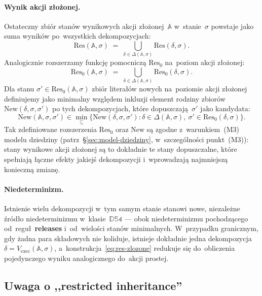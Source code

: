 \documentclass[11pt,a4paper]{article}
\newcommand{\releases}{\textbf{releases}}
\theoremstyle{definition}
\begin{document}
\paragraph{Wynik akcji złożonej.}
Ostateczny zbiór stanów wynikowych akcji złożonej~$\mathbb{A}$
w~stanie~$\sigma$ powstaje jako suma wyników po~wszystkich dekompozycjach:
\begin{equation}
  \label{eq:res-zlozone}
  \mathrm{Res}(\mathbb{A},\sigma)
  \;=\; \bigcup_{\delta \in \Delta(\mathbb{A},\sigma)}
        \mathrm{Res}(\delta,\sigma).
\end{equation}
Analogicznie rozszerzamy funkcję pomocniczą $\mathrm{Res}_0$ na~poziom
akcji złożonej:
\[
  \mathrm{Res}_0(\mathbb{A},\sigma)
    \;=\; \bigcup_{\delta \in \Delta(\mathbb{A},\sigma)}
          \mathrm{Res}_0(\delta,\sigma).
\]
Dla stanu $\sigma' \in \mathrm{Res}_0(\mathbb{A},\sigma)$ zbiór
literałów nowych na~poziomie akcji złożonej definiujemy jako
minimalny względem inkluzji element rodziny zbiorów
$\mathrm{New}(\delta,\sigma,\sigma')$ po tych dekompozycjach, które
dopuszczają~$\sigma'$ jako kandydata:
\[
  \mathrm{New}(\mathbb{A},\sigma,\sigma')
    \in \min_{\subseteq}
      \{\mathrm{New}(\delta,\sigma,\sigma') :
        \delta \in \Delta(\mathbb{A},\sigma),\
        \sigma' \in \mathrm{Res}_0(\delta,\sigma)\}.
\]
Tak zdefiniowane rozszerzenia $\mathrm{Res}_0$ oraz $\mathrm{New}$
są zgodne z~warunkiem~(M3) modelu dziedziny (patrz~\S\ref{sec:model-dziedziny},
w~szczególności punkt~(M3)): stany wynikowe akcji złożonej
są to dokładnie te stany dopuszczalne, które spełniają łączne efekty
jakiejś dekompozycji i~wprowadzają najmniejszą konieczną zmianę.

\paragraph{Niedeterminizm.}
Istnienie wielu dekompozycji w~tym samym stanie stanowi nowe, niezależne
źródło niedeterminizmu w~klasie~$\mathbb{DS4}$ --- obok niedeterminizmu
pochodzącego od~reguł~\releases{} i~od~wielości stanów minimalnych.
W~przypadku granicznym, gdy żadna para składowych nie koliduje,
istnieje dokładnie jedna dekompozycja $\delta = V_{\mathrm{exec}}(\mathbb{A},\sigma)$,
a~konstrukcja~\eqref{eq:res-zlozone} redukuje się do~obliczenia
pojedynczego wyniku analogicznego do~akcji prostej.

\subsection{Uwaga o ,,restricted inheritance''}
\label{sec:restricted-inheritance}
\end{document}
